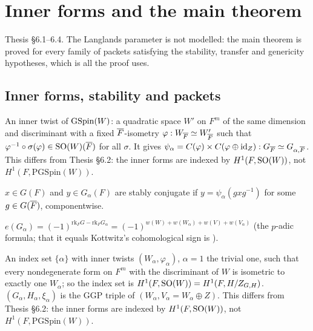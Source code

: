 \chapter{Inner forms and the main theorem}
\label{chap:mainthm}
Thesis \S6.1--6.4. The Langlands parameter is not modelled: the main theorem is proved for every
family of packets satisfying the stability, transfer and genericity hypotheses, which is all the proof
uses.

\section{Inner forms, stability and packets}
\begin{definition}
\label{InnerTwist}
\leanok
An inner twist of $\mathrm{GSpin}(W)$: a quadratic space $W'$ on $F^m$ of the same dimension and discriminant
with a fixed $\overline{F}$-isometry $\varphi:W_{\overline{F}}\simeq W'_{\overline{F}}$ such that
$\varphi^{-1}\circ\sigma(\varphi)\in\mathrm{SO}(W)(\overline{F})$ for all $\sigma$. It gives
$\psi_\alpha=C(\varphi)\times C(\varphi\oplus\mathrm{id}_Z):G_{\overline{F}}\simeq G_{\alpha,\overline{F}}$.
This differs from Thesis \S6.2: the inner forms are indexed by $H^1(F,\mathrm{SO}(W))$, not $H^1(F,\mathrm{PGSpin}(W))$.
\end{definition}

\begin{definition}
\label{StablyConjG}
\leanok
{}
$x\in G(F)$ and $y\in G_\alpha(F)$ are stably conjugate if $y=\psi_\alpha(g x g^{-1})$ for some
$g\in G(\overline{F})$, componentwise.
\end{definition}

\begin{definition}
\label{kottwitzSign}
\leanok
{}
$e(G_\alpha) = (-1)^{\mathrm{rk}_F G-\mathrm{rk}_F G_\alpha}=(-1)^{w(W)+w(W_\alpha)+w(V)+w(V_\alpha)}$
(the $p$-adic formula; that it equals Kottwitz's cohomological sign is \cite{Kot83}).
\end{definition}

\begin{definition}
\label{InnerFormSystem}
\leanok
{}
An index set $\{\alpha\}$ with inner twists $(W_\alpha,\varphi_\alpha)$, $\alpha=1$ the trivial one, such that every
nondegenerate form on $F^m$ with the discriminant of $W$ is isometric to exactly one $W_\alpha$; so the index
set is $H^1(F,\mathrm{SO}(W))=H^1(F,H/Z_{G,H})$. $(G_\alpha,H_\alpha,\xi_\alpha)$ is the GGP triple of
$(W_\alpha,V_\alpha=W_\alpha\oplus Z)$. This differs from Thesis \S6.2: the inner forms are indexed by
$H^1(F,\mathrm{SO}(W))$, not $H^1(F,\mathrm{PGSpin}(W))$.
\end{definition}

